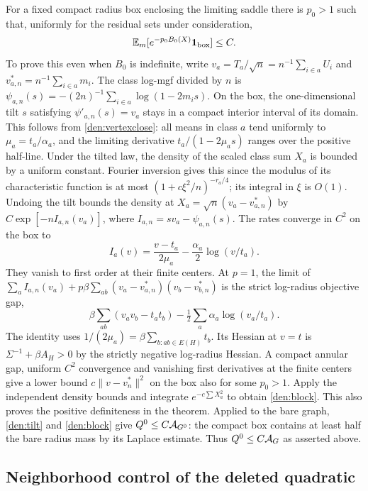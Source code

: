 For a fixed compact radius box enclosing the limiting saddle there is \(p_0>1\) such that, uniformly for the residual sets under consideration,
\begin{equation}\label{den:block}
 \mathbb E_m[e^{-p_0 B_0(X)}\mathbf 1_{\rm box}]\le C .
\end{equation}
To prove this even when \(B_0\) is indefinite, write \(v_a=T_a/\sqrt n=n^{-1}\sum_{i\in a}U_i\) and \(v^*_{a,n}=n^{-1}\sum_{i\in a}m_i\). The class log-mgf divided by \(n\) is \(\psi_{a,n}(s)=-(2n)^{-1}\sum_{i\in a}\log(1-2m_i s)\). On the box, the one-dimensional tilt \(s\) satisfying \(\psi'_{a,n}(s)=v_a\) stays in a compact interior interval of its domain. This follows from \eqref{den:vertexclose}: all means in class \(a\) tend uniformly to \(\mu_a=t_a/\alpha_a\), and the limiting derivative \(t_a/(1-2\mu_a s)\) ranges over the positive half-line. Under the tilted law, the density of the scaled class sum \(X_a\) is bounded by a uniform constant. Fourier inversion gives this since the modulus of its characteristic function is at most \((1+c\xi^2/n)^{-r_a/4}\); its integral in \(\xi\) is \(O(1)\). Undoing the tilt bounds the density at \(X_a=\sqrt n(v_a-v_{a,n}^*)\) by \(C\exp[-n I_{a,n}(v_a)]\), where \(I_{a,n}=sv_a-\psi_{a,n}(s)\). The rates converge in \(C^2\) on the box to
\[
 I_a(v)=\frac{v-t_a}{2\mu_a}-\frac{\alpha_a}{2}\log(v/t_a).
\]
They vanish to first order at their finite centers. At \(p=1\), the limit of
\(\sum_a I_{a,n}(v_a)+p\beta\sum_{ab}(v_a-v_{a,n}^*)(v_b-v_{b,n}^*)\)
is the strict log-radius objective gap,
\[
 \beta\sum_{ab}(v_av_b-t_at_b)-\tfrac12\sum_a\alpha_a\log(v_a/t_a).
\]
The identity uses \(1/(2\mu_a)=\beta\sum_{b:ab\in E(H)}t_b\). Its Hessian at \(v=t\) is \(\Sigma^{-1}+\beta A_H>0\) by the strictly negative log-radius Hessian. A compact annular gap, uniform \(C^2\) convergence and vanishing first derivatives at the finite centers give a lower bound \(c\|v-v_n^*\|^2\) on the box also for some \(p_0>1\). Apply the independent density bounds and integrate \(e^{-c\sum X_a^2}\) to obtain \eqref{den:block}. This also proves the positive definiteness in the theorem. Applied to the bare graph, \eqref{den:tilt} and \eqref{den:block} give \(Q^0\le C {\cal A}_{G^0}\): the compact box contains at least half the bare radius mass by its Laplace estimate. Thus \(Q^0\le C{\cal A}_G\) as asserted above.

\subsection{Neighborhood control of the deleted quadratic}

